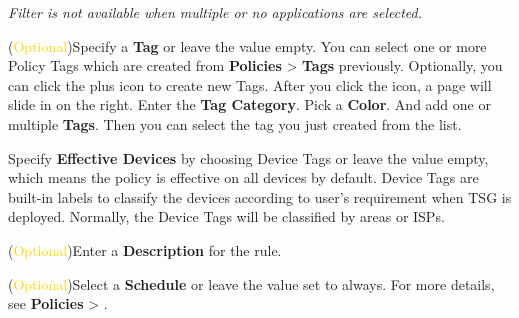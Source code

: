 \begin{description}
    
    \notemark\textit{Filter is not available when multiple or no applications are selected.}
    \item[STEP 7.]	(\textcolor{gold}{Optional})Specify a \textbf{Tag} or leave the value empty.
    You can select one or more Policy Tags which are created from \textbf{Policies} > \textbf{Tags} previously. 
    Optionally, you can click the plus icon to create new Tags. After you click the icon, a page will slide in on the right. Enter the \textbf{Tag Category}. 
    Pick a \textbf{Color}. And add one or multiple \textbf{Tags}. Then you can select the tag you just created from the list.
    \item[STEP 8.]	Specify \textbf{Effective Devices} by choosing Device Tags or leave the value empty, which means the policy is effective on all devices by default. 
    Device Tags are built-in labels to classify the devices according to user’s requirement when TSG is deployed. Normally, the Device Tags will be classified by areas or ISPs.
    \item[STEP 9.]	(\textcolor{gold}{Optional})Enter a \textbf{Description} for the rule.
    \item[STEP 10.]	(\textcolor{gold}{Optional})Select a \textbf{Schedule} or leave the value set to always. For more details, see \textbf{Policies} > \textbf{\hyperlink{link:Schedules}{\color{linkblue}{Schedules}}}.
    

\end{description}
